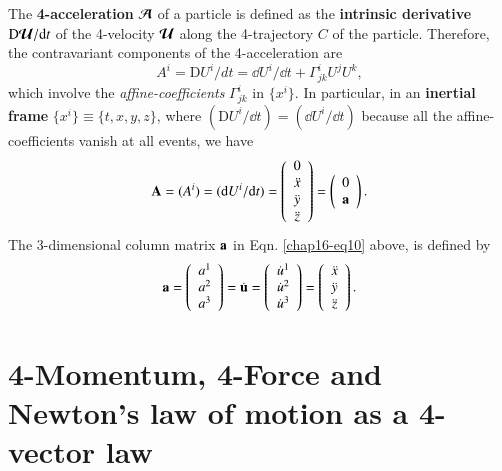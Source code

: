 The \textbf{4-acceleration}   $\bm{\mathcal{A}}$ of a particle is defined as the \textbf{intrinsic derivative} ${\mathrm{D}} \bm{\mathcal{U}}/\mathrm{d} t$ of the 4-velocity $\bm{\mathcal{U}}$ along the 4-trajectory $C$ of the particle. Therefore, the contravariant components of the 4-acceleration are 
\begin{equation}
A^i= {\mathrm{D}}U^i /dt=\dd  U^i /\dd t + \Gamma^i _{jk}  U^j U^k ,\label{chap16-eq9}
\end{equation}
which involve the \textsl{affine-coefficients}  $\Gamma^i_{jk}$ in $\{x^i\}$. In particular, in an \textbf{inertial frame} $\{x^i\}\equiv\{t,x,y,z\}$, where $({\mathrm D}U^i/\dd t)=    ( \dd U^i /\dd t)$ because  all the affine-coefficients vanish at all events, we have
\begin{equation}
{\mathbf{A}}=(A^i) =( \mathrm{d} U^i /\mathrm{d} t)=\left(\begin{array}{c} 0\\ \ddot{x}
\\ \ddot{y}\\ \ddot{z}\end{array}\right)
 =\left(\begin{array}{c} 0\\ \mathbf{a}\end{array}\right).\label{chap16-eq10}
\end{equation}
The  3-dimensional column matrix $\mathbf{a}$ in Eqn. \eqref{chap16-eq10} above, is defined by  
\begin{equation}
\mathbf{a}=\left(\begin{array}{c}
a^1\\a^2\\a^3\end{array}\right)=\dot{\mathbf{u}}=\left(\begin{array}{c}
\dot{u}^1\\\dot{u}^2\\\dot{u}^3\end{array}\right)
= \left(\begin{array}{c}\ddot{x}\\\ddot{y}\\\ddot{z}\end{array}\right).\label{chap16-eq11}
\end{equation}

\section{4-Momentum, 4-Force and Newton's law of motion as a 4-vector law}\label{chap16-sec4}


